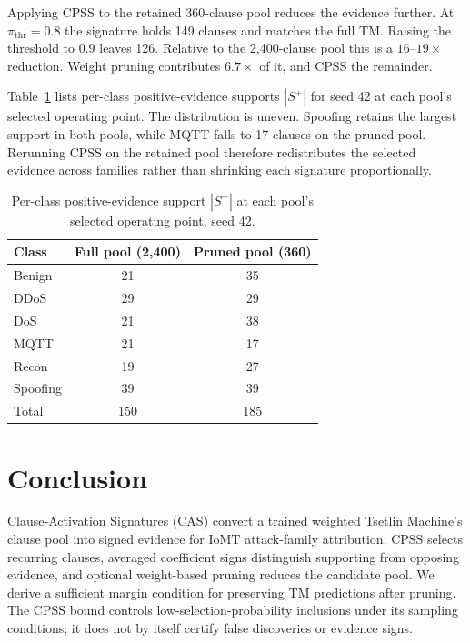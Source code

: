\documentclass[conference]{IEEEtran}
\begin{document}
Applying CPSS to the retained 360-clause pool reduces the evidence
further. At $\pi_{\mathrm{thr}}=0.8$ the signature holds 149 clauses
and matches the full TM. Raising the threshold to $0.9$ leaves 126.
Relative to the 2,400-clause pool this is a $16$--$19\times$ reduction.
Weight pruning contributes $6.7\times$ of it, and CPSS the remainder.

Table~\ref{tab:reduction} lists per-class positive-evidence supports
$|S^+|$ for seed 42 at each pool's selected operating point. The
distribution is uneven. Spoofing retains the largest support in both
pools, while MQTT falls to 17 clauses on the pruned pool. Rerunning
CPSS on the retained pool therefore redistributes the selected evidence
across families rather than shrinking each signature proportionally.

\begin{table}[!htb]
\centering
\caption{Per-class positive-evidence support $|S^+|$ at each pool's
selected operating point, seed 42.}
\label{tab:reduction}
\footnotesize
\begin{tabular}{@{}lcc@{}}
\toprule
Class & Full pool (2,400) & Pruned pool (360) \\
\midrule
Benign & 21 & 35 \\
DDoS & 29 & 29 \\
DoS & 21 & 38 \\
MQTT & 21 & 17 \\
Recon & 19 & 27 \\
Spoofing & 39 & 39 \\
\midrule
Total & 150 & 185 \\
\bottomrule
\end{tabular}
\end{table}

\section{Conclusion}
Clause-Activation Signatures (CAS) convert a trained weighted Tsetlin
Machine's clause pool into signed evidence for IoMT attack-family
attribution. CPSS selects recurring clauses, averaged coefficient signs
distinguish supporting from opposing evidence, and optional weight-based
pruning reduces the candidate pool. We derive a sufficient margin
condition for preserving TM predictions after pruning. The CPSS bound
controls low-selection-probability inclusions under its sampling
conditions; it does not by itself certify false discoveries or evidence signs.
\end{document}
